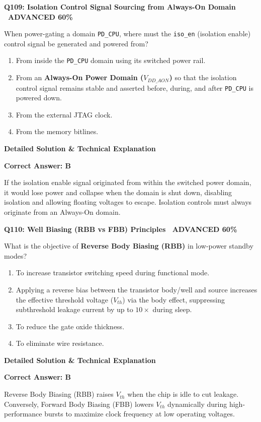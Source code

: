 \documentclass[11pt,a4paper]{article}
\newcommand{\badgeadv}{{\color{white}\colorbox{advred}{\bfseries\sffamily\tiny\ ADVANCED 60\%\ }}}
\newenvironment{qbox}[2]{%
  \begin{mdframed}[style=qstyle]%
  {\bfseries\sffamily\color{primaryblue}#1 \hfill #2}\par\vspace{2pt}%
}{%
  \end{mdframed}%
}
\newenvironment{ansbox}{%
  \begin{mdframed}[style=ansstyle]%
  {\bfseries\sffamily\color{ansgreen}\small Detailed Solution \& Technical Explanation}\par\vspace{2pt}\small%
}{%
  \end{mdframed}%
}
\begin{document}
\begin{qbox}{Q109: Isolation Control Signal Sourcing from Always-On Domain}{\badgeadv}
When power-gating a domain \texttt{PD\_CPU}, where must the \texttt{iso\_en} (isolation enable) control signal be generated and powered from?
\begin{enumerate}[label=\textbf{\Alph*.}]
  \item From inside the \texttt{PD\_CPU} domain using its switched power rail.
  \item From an \textbf{Always-On Power Domain ($V_{DD\_AON}$)} so that the isolation control signal remains stable and asserted before, during, and after \texttt{PD\_CPU} is powered down.
  \item From the external JTAG clock.
  \item From the memory bitlines.
\end{enumerate}
\end{qbox}
\begin{ansbox}
\textbf{Correct Answer: B}

If the isolation enable signal originated from within the switched power domain, it would lose power and collapse when the domain is shut down, disabling isolation and allowing floating voltages to escape. Isolation controls must always originate from an Always-On domain.
\end{ansbox}

\begin{qbox}{Q110: Well Biasing (RBB vs FBB) Principles}{\badgeadv}
What is the objective of \textbf{Reverse Body Biasing (RBB)} in low-power standby modes?
\begin{enumerate}[label=\textbf{\Alph*.}]
  \item To increase transistor switching speed during functional mode.
  \item Applying a reverse bias between the transistor body/well and source increases the effective threshold voltage ($V_{th}$) via the body effect, suppressing subthreshold leakage current by up to $10\times$ during sleep.
  \item To reduce the gate oxide thickness.
  \item To eliminate wire resistance.
\end{enumerate}
\end{qbox}
\begin{ansbox}
\textbf{Correct Answer: B}

Reverse Body Biasing (RBB) raises $V_{th}$ when the chip is idle to cut leakage. Conversely, Forward Body Biasing (FBB) lowers $V_{th}$ dynamically during high-performance bursts to maximize clock frequency at low operating voltages.
\end{ansbox}
\end{document}
